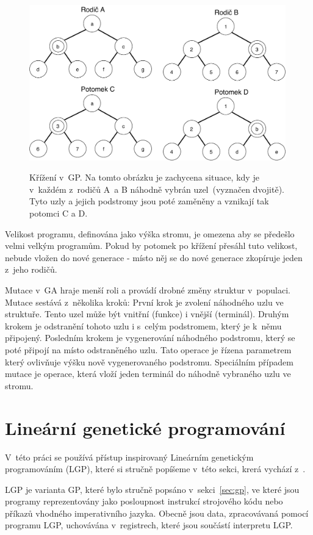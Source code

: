 \begin{figure}[h]
    \centering
    {\includegraphics[width=30em]{obrazky/gp_krizeni.pdf}}
    \caption[Křížení v~GP]{
    Křížení v~GP.
    Na tomto obrázku je zachycena situace, kdy je v~každém z~rodičů A~a B náhodně vybrán uzel~(vyznačen dvojitě).
    Tyto uzly a jejich podstromy jsou poté zaměněny a vznikají tak potomci C a D.
    }
    \label{fig:GP_krizeni}
\end{figure}

Velikost programu, definována jako výška stromu, je omezena aby se předešlo velmi velkým programům.
Pokud by potomek po křížení přesáhl tuto velikost, nebude vložen do nové generace - místo něj se do nové generace zkopíruje jeden z~jeho rodičů.

Mutace v~GA hraje menší roli a provádí drobné změny struktur v~populaci.
Mutace sestává z~několika kroků:
První krok je zvolení náhodného uzlu ve struktuře.
Tento uzel může být vnitřní (funkce) i vnější (terminál).
Druhým krokem je odstranění tohoto uzlu i s~celým podstromem, který je k~němu připojený.
Posledním krokem je vygenerování náhodného podstromu, který se poté připojí na místo odstraněného uzlu.
Tato operace je řízena parametrem který ovlivňuje výšku nově vygenerovaného podstromu.
Speciálním případem mutace je operace, která vloží jeden terminál do náhodně vybraného uzlu ve stromu.

\section{Lineární genetické programování}
\label{sec:lgp}

V~této práci se používá přístup inspirovaný Lineárním genetickým programováním (LGP), které si stručně popíšeme v~této sekci, krerá vychází z~\cite{Brameier2010}.

LGP je varianta GP, které bylo stručně popsáno v~sekci~\ref{sec:gp}, ve které jsou programy reprezentovány jako posloupnost instrukcí strojového kódu nebo příkazů vhodného imperativního jazyka.
Obecně jsou data, zpracovávaná pomocí programu LGP, uchovávána v~registrech, které jsou součástí interpretu LGP.

